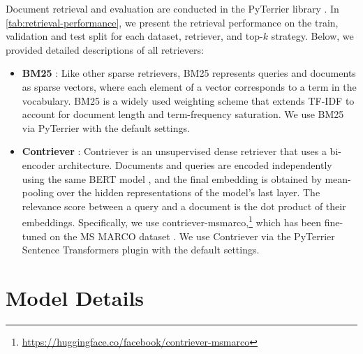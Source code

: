 \documentclass[11pt]{article}
\begin{document}
Document retrieval and evaluation are conducted in the PyTerrier library \citep{pyterrier}. In \autoref{tab:retrieval-performance}, we present the retrieval performance on the train, validation and test split for each dataset, retriever, and top-\(k\) strategy. Below, we provided detailed descriptions of all retrievers:

\begin{itemize}
    \item \textbf{BM25} \citep{BM25}: Like other sparse retrievers, BM25 represents queries and documents as sparse vectors, where each element of a vector corresponds to a term in the vocabulary. BM25 is a widely used weighting scheme that extends TF-IDF \citep{tf-idf} to account for document length and term-frequency saturation. We use BM25 via PyTerrier with the default settings.
    \item \textbf{Contriever} \citep{contriever}: Contriever is an unsupervised dense retriever that uses a bi-encoder architecture. Documents and queries are encoded independently using the same BERT model \citep{bert}, and the final embedding is obtained by mean-pooling over the hidden representations of the model's last layer. The relevance score between a query and a document is the dot product of their embeddings. Specifically, we use contriever-msmarco,\footnote{\url{https://huggingface.co/facebook/contriever-msmarco}} which has been fine-tuned on the MS MARCO dataset \citep{MSMARCO}. We use Contriever via the PyTerrier Sentence Transformers plugin \citep{Soldaini_PyTerrier_Sentence_Transformers_2022} with the default settings.
\end{itemize}

\section{Model Details}
\label{appendix:model-details}
\end{document}
